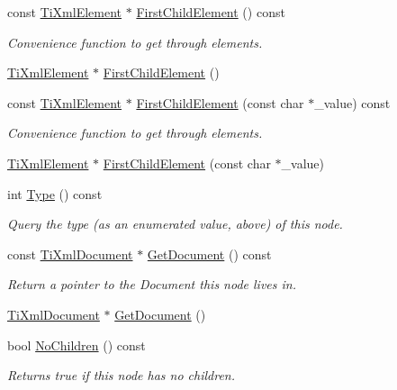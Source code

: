 \begin{DoxyCompactItemize}
\item 
const \hyperlink{classTiXmlElement}{TiXmlElement} $\ast$ \hyperlink{classTiXmlNode_ab1f8d8e70d88aea4c5efedfe00862d55}{FirstChildElement} () const 
\begin{DoxyCompactList}\small\item\em Convenience function to get through elements. \item\end{DoxyCompactList}\item 
\hyperlink{classTiXmlElement}{TiXmlElement} $\ast$ \hyperlink{classTiXmlNode_aa0fecff1f3866ab33a8a25506e95db1d}{FirstChildElement} ()
\item 
const \hyperlink{classTiXmlElement}{TiXmlElement} $\ast$ \hyperlink{classTiXmlNode_a0ec361bfef1cf1978d060295f597e0d9}{FirstChildElement} (const char $\ast$\_\-value) const 
\begin{DoxyCompactList}\small\item\em Convenience function to get through elements. \item\end{DoxyCompactList}\item 
\hyperlink{classTiXmlElement}{TiXmlElement} $\ast$ \hyperlink{classTiXmlNode_a6936ae323675071808ac4840379e57f5}{FirstChildElement} (const char $\ast$\_\-value)
\item 
int \hyperlink{classTiXmlNode_a57b99d5c97d67a42b9752f5210a1ba5e}{Type} () const 
\begin{DoxyCompactList}\small\item\em Query the type (as an enumerated value, above) of this node. \item\end{DoxyCompactList}\item 
const \hyperlink{classTiXmlDocument}{TiXmlDocument} $\ast$ \hyperlink{classTiXmlNode_aa66f4ebcd175204a168ed7c2d7b43071}{GetDocument} () const 
\begin{DoxyCompactList}\small\item\em Return a pointer to the Document this node lives in. \item\end{DoxyCompactList}\item 
\hyperlink{classTiXmlDocument}{TiXmlDocument} $\ast$ \hyperlink{classTiXmlNode_a7b2372c0e7adfb32f5b6902fe49a39b2}{GetDocument} ()
\item 
bool \hyperlink{classTiXmlNode_aeed21ad30630ef6e7faf096127edc9f3}{NoChildren} () const 
\begin{DoxyCompactList}\small\item\em Returns true if this node has no children. \item\end{DoxyCompactList}\item 

\end{DoxyCompactItemize}
